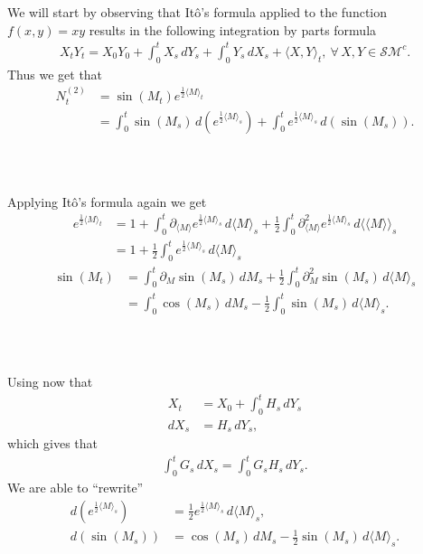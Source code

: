 \documentclass{beamer}
\numberwithin{equation}{section}
\newenvironment{frame2}{\begin{frame}\frametitle{{\normalsize \secname} \\ {\large \subsecname}}}{\end{frame}}
\begin{document}
\begin{frame2}
    We will start by observing that Itô's formula applied to the function $f(x,y) = xy$ results in the following integration by parts formula
    \begin{align*}
        X_tY_t = X_0Y_0 + \int_0^t X_s \, dY_s + \int_0^tY_s\, dX_s + \langle X,Y \rangle_t, \ \forall\, X,Y \in \mathcal{SM}^c.
    \end{align*}
    Thus we get that
    \begin{align}
         N_t^{(2)} &= \sin(M_t)e^{\frac{1}{2}\langle M \rangle_t} \\
        &= \int_0^t \sin(M_s) \, d\left(e^{\frac{1}{2}\langle M \rangle_s}\right) + \int_0^t e^{\frac{1}{2}\langle M \rangle_s} \, d \left(\sin(M_s)\right).
    \end{align}
\end{frame2}

\begin{frame2}
    Applying Itô's formula again we get
    \begin{align}
        e^{\frac{1}{2}\langle M \rangle_t} &= 1 + \int_0^t\partial_{\langle M \rangle}e^{\frac{1}{2}\langle M \rangle_s}\, d\langle M \rangle_s + \frac{1}{2}\int_0^t\partial^2_{\langle M \rangle} e^{\frac{1}{2}\langle M \rangle_s} \, d \langle\langle M \rangle\rangle_s \nonumber \\
        &= 1 + \frac{1}{2}\int_0^te^{\frac{1}{2}\langle M \rangle_s}\, d\langle M \rangle_s
    \end{align}
    \begin{align}
        \sin(M_t) &= \int_0^t\partial_{M}\sin(M_s)\, dM_s + \frac{1}{2}\int_0^t\partial_{M}^2\sin(M_s) \, d \langle M \rangle_s \\
        &= \int_0^t \cos(M_s) \, dM_s - \frac{1}{2}\int_0^t\sin(M_s)\, d\langle M \rangle_s.
    \end{align}
\end{frame2}

\begin{frame2}
    Using now that
    \begin{align*}
        X_t &= X_0 + \int_0^t H_s \, dY_s \\
        dX_s &= H_s \, dY_s, 
    \end{align*}
    which gives that
    \begin{align*}
        \int_0^t G_s \, d X_s = \int_0^t G_s H_s \, dY_s.
    \end{align*}
    We are able to ``rewrite''
    \begin{align*}
        d\left(e^{\frac{1}{2}\langle M \rangle_s}\right) &= \frac{1}{2}e^{\frac{1}{2}\langle M \rangle_s} \, d \langle M \rangle_s, \\
        d \left(\sin(M_s)\right) &= \cos(M_s) \, dM_s - \frac{1}{2}\sin(M_s)\, d\langle M \rangle_s.
    \end{align*}
\end{frame2}
\end{document}
